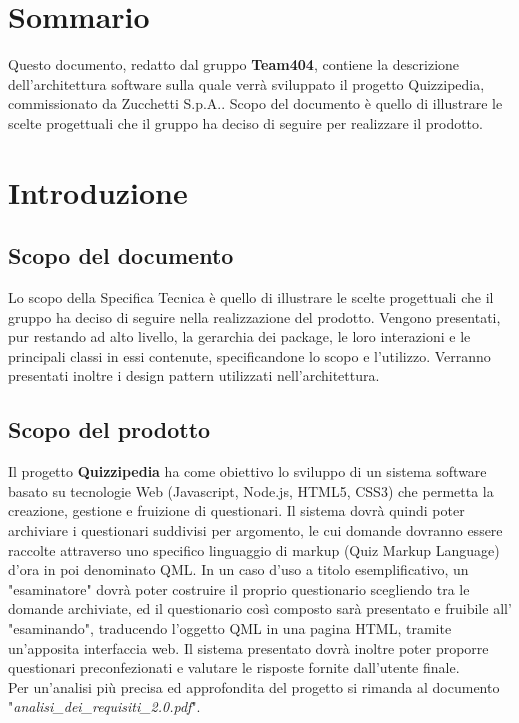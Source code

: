 \documentclass[a4paper,11pt]{article}
\begin{document}
	\newpage
	\fancyhead[R]{\leftmark}
	\tableofcontents
	\newpage
	\listoffigures
	\listoftables
	
	\newpage
	
	\section*{Sommario}
	Questo documento, redatto dal gruppo \textbf{Team404}, contiene la descrizione dell'architettura software sulla quale verrà sviluppato il progetto Quizzipedia, commissionato da Zucchetti S.p.A..
Scopo del documento è quello di illustrare le scelte progettuali che il gruppo ha deciso di
seguire per realizzare il prodotto.
	
	\newpage
	\section{Introduzione}
	\subsection{Scopo del documento}
	Lo scopo della Specifica Tecnica è quello di illustrare le scelte progettuali che il gruppo ha deciso di seguire nella realizzazione del prodotto. Vengono presentati, pur restando ad alto
livello, la gerarchia dei package, le loro interazioni e le principali classi in essi contenute, specificandone lo scopo e l'utilizzo. Verranno presentati inoltre i design pattern utilizzati nell'architettura.
	
	\subsection{Scopo del prodotto}
	Il progetto \textbf{Quizzipedia} ha come obiettivo lo sviluppo di un sistema software basato su tecnologie Web (Javascript\addglos, Node.js\addglos, HTML5\addglos, CSS3\addglos) che permetta la creazione, gestione e fruizione di questionari. Il sistema dovrà quindi poter archiviare i questionari suddivisi per argomento, le cui domande dovranno essere raccolte attraverso uno specifico linguaggio di markup (Quiz Markup Language) d'ora in poi denominato QML\addglos. In un caso d'uso a titolo esemplificativo, un "esaminatore" dovrà poter costruire il proprio questionario scegliendo tra le domande archiviate, ed il questionario così composto sarà presentato e fruibile all' "esaminando", traducendo l'oggetto QML in una pagina HTML\addglos, tramite un'apposita interfaccia web. Il sistema presentato dovrà inoltre poter proporre questionari preconfezionati e valutare le risposte fornite dall'utente finale.
	\\
	Per un'analisi più precisa ed approfondita del progetto si rimanda al documento\\ "\textit{analisi\_dei\_requisiti\_2.0.pdf}".
\end{document}
